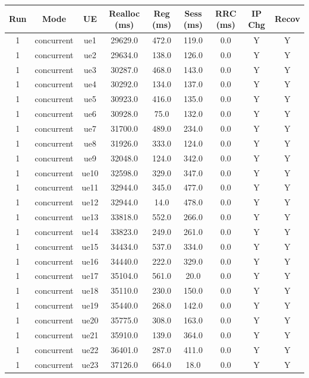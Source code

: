 \begin{table}[ht]
\centering
\begin{tabular}{|c|c|c|c|c|c|c|c|c|}
\hline
Run & Mode & UE & Realloc (ms) & Reg (ms) & Sess (ms) & RRC (ms) & IP Chg & Recov \\
\hline
1 & concurrent & ue1 & 29629.0 & 472.0 & 119.0 & 0.0 & Y & Y \\
1 & concurrent & ue2 & 29634.0 & 138.0 & 126.0 & 0.0 & Y & Y \\
1 & concurrent & ue3 & 30287.0 & 468.0 & 143.0 & 0.0 & Y & Y \\
1 & concurrent & ue4 & 30292.0 & 134.0 & 137.0 & 0.0 & Y & Y \\
1 & concurrent & ue5 & 30923.0 & 416.0 & 135.0 & 0.0 & Y & Y \\
1 & concurrent & ue6 & 30928.0 & 75.0 & 132.0 & 0.0 & Y & Y \\
1 & concurrent & ue7 & 31700.0 & 489.0 & 234.0 & 0.0 & Y & Y \\
1 & concurrent & ue8 & 31926.0 & 333.0 & 124.0 & 0.0 & Y & Y \\
1 & concurrent & ue9 & 32048.0 & 124.0 & 342.0 & 0.0 & Y & Y \\
1 & concurrent & ue10 & 32598.0 & 329.0 & 347.0 & 0.0 & Y & Y \\
1 & concurrent & ue11 & 32944.0 & 345.0 & 477.0 & 0.0 & Y & Y \\
1 & concurrent & ue12 & 32944.0 & 14.0 & 478.0 & 0.0 & Y & Y \\
1 & concurrent & ue13 & 33818.0 & 552.0 & 266.0 & 0.0 & Y & Y \\
1 & concurrent & ue14 & 33823.0 & 249.0 & 261.0 & 0.0 & Y & Y \\
1 & concurrent & ue15 & 34434.0 & 537.0 & 334.0 & 0.0 & Y & Y \\
1 & concurrent & ue16 & 34440.0 & 222.0 & 329.0 & 0.0 & Y & Y \\
1 & concurrent & ue17 & 35104.0 & 561.0 & 20.0 & 0.0 & Y & Y \\
1 & concurrent & ue18 & 35110.0 & 230.0 & 150.0 & 0.0 & Y & Y \\
1 & concurrent & ue19 & 35440.0 & 268.0 & 142.0 & 0.0 & Y & Y \\
1 & concurrent & ue20 & 35775.0 & 308.0 & 163.0 & 0.0 & Y & Y \\
1 & concurrent & ue21 & 35910.0 & 139.0 & 364.0 & 0.0 & Y & Y \\
1 & concurrent & ue22 & 36401.0 & 287.0 & 411.0 & 0.0 & Y & Y \\
1 & concurrent & ue23 & 37126.0 & 664.0 & 18.0 & 0.0 & Y & Y \\

\end{tabular}
\end{table}
